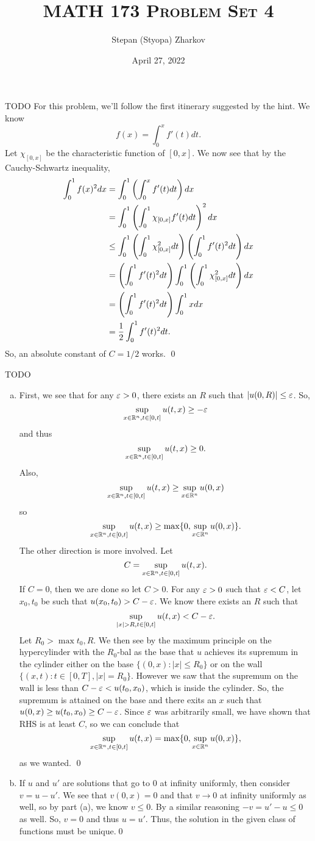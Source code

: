 \documentclass{article}
\title{\textsc{MATH 173 Problem Set 4}}
\author{Stepan (Styopa) Zharkov}
\date{April 27, 2022}
\begin{document}
\maketitle
{} TODO \tri
\hop
\solution
For this problem, we'll follow the first itinerary suggested by the hint. We know
\[f(x) = \int_0^x f'(t)dt.\]
Let $\chi_{[0,x]}$ be the characteristic function of $[0,x]$. We now see that by the Cauchy-Schwartz inequality,
\begin{align*}
    \int_0^1f(x)^2 dx &= \int_0^1\del{ \int_0^x f'(t)dt}dx \\
    &= \int_0^1\del{ \int_0^1 \chi_{[0,x]}f'(t)dt}^2dx \\
    & \le  \int_0^1\del{ \int_0^1 \chi_{[0,x]}^2dt}\del{ \int_0^1 f'(t)^2dt}dx \\
    &= \del{ \int_0^1 f'(t)^2dt} \int_0^1\del{ \int_0^1 \chi_{[0,x]}^2dt}dx \\
    &=  \del{ \int_0^1 f'(t)^2dt} \int_0^1 xdx \\
    &=\frac{1}{2}   \int_0^1 f'(t)^2dt.
\end{align*}
So, an absolute constant of $C = 1/2$ works. \qed

\newpage
{} TODO \tri
\hop
\solution
\begin{enumerate}[(a)]
    \item First, we see that for any $\varepsilon > 0$, there exists an $R$ such that $|u(0,R)| \le \varepsilon$. So, 
    \[\sup_{x \in \mathbb{R}^n, t \in [0,t]}u(t,x) \ge -\varepsilon\]
    and thus 
    \[\sup_{x \in \mathbb{R}^n, t \in [0,t]}u(t,x) \ge 0.\]
    Also,
    \[\sup_{x \in \mathbb{R}^n, t \in [0,t]}u(t,x) \ge \sup_{x \in \mathbb{R}^n}u(0,x)\]
    so 
    \[\sup_{x \in \mathbb{R}^n, t \in [0,t]}u(t,x) \ge \max\{0, \sup_{x \in \mathbb{R}^n}u(0,x)\}.\]
    The other direction is more involved. Let
    \[C = \sup_{x \in \mathbb{R}^n, t \in [0,t]}u(t,x).\]
    If $C = 0$, then we are done so let $C>0$.
    For any $\varepsilon > 0$ such that $\varepsilon < C$, let $x_0, t_0$ be such that $u(x_0, t_0) > C - \varepsilon$. We know there exists an $R$ such that 
    \[\sup_{|x| > R, t \in [0,t]}u(t,x) < C - \varepsilon.\]
    Let $R_0 > \max{t_0, R}$. We then see by the maximum principle on the hypercylinder with the $R_0$-bal as the base that $u$ achieves its supremum in the cylinder either on the base $\{(0,x): |x| \le R_0\}$ or on the wall $\{(x,t) : t \in [0,T], |x| = R_0\}$. However we saw that the supremum on the wall is less than $C-\varepsilon < u(t_0, x_0)$, which is inside the cylinder. So, the supremum is attained on the base and there exits an $x$ such that $u(0,x) \ge u(t_0, x_0) \ge C- \varepsilon$. Since $\varepsilon$ was arbitrarily small, we have shown that RHS is at least $C$, so we can conclude that 
    \[\sup_{x \in \mathbb{R}^n, t \in [0,t]}u(t,x) = \max\{0, \sup_{x \in \mathbb{R}^n}u(0,x)\},\]
    as we wanted. \qed
    \item If $u$ and $u'$ are solutions that go to 0 at infinity uniformly, then consider $v = u - u'$. We see that $v(0,x) = 0$ and that $v \to 0$ at infinity uniformly as well, so by part (a), we know $v \le 0$. By a similar reasoning $-v = u' - u \le 0$ as well. So, $v = 0$ and thus $u = u'$. Thus, the solution in the given class of functions must be unique.\qed 
\end{enumerate}
\end{document}
